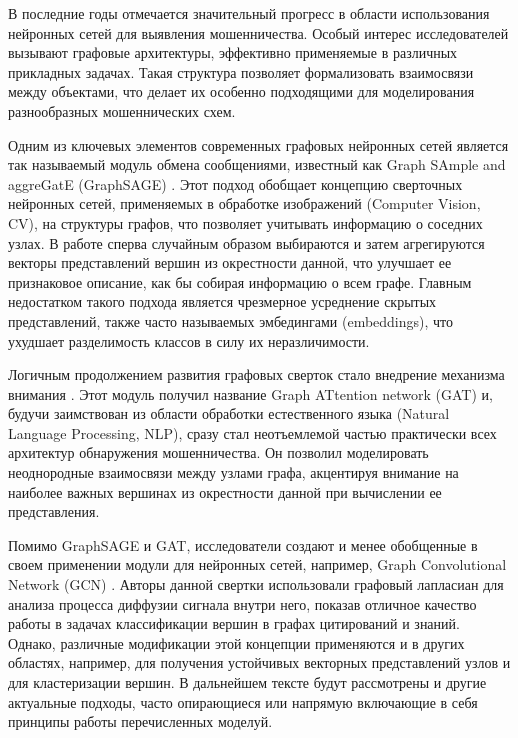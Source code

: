 
В последние годы отмечается значительный прогресс в области использования нейронных сетей для выявления мошенничества. Особый интерес исследователей вызывают графовые архитектуры, эффективно применяемые в различных прикладных задачах. Такая структура позволяет формализовать взаимосвязи между объектами, что делает их особенно подходящими для моделирования разнообразных мошеннических схем.

Одним из ключевых элементов современных графовых нейронных сетей является так называемый модуль обмена сообщениями, известный как Graph SAmple and aggreGatE (GraphSAGE) \cite{hamilton2017}. Этот подход обобщает концепцию сверточных нейронных сетей, применяемых в обработке изображений (Computer Vision, CV), на структуры графов, что позволяет учитывать информацию о соседних узлах. В работе сперва случайным образом выбираются и затем агрегируются векторы представлений вершин из окрестности данной, что улучшает ее признаковое описание, как бы собирая информацию о всем графе. Главным недостатком такого подхода является чрезмерное усреднение скрытых представлений, также часто называемых эмбедингами (embeddings), что ухудшает разделимость классов в силу их неразличимости.

Логичным продолжением развития графовых сверток стало внедрение механизма внимания \cite{vaswani2017}. Этот модуль получил название Graph ATtention network (GAT) \cite{velickovic2017} и, будучи заимствован из области обработки естественного языка (Natural Language Processing, NLP), сразу стал неотъемлемой частью практически всех архитектур обнаружения мошенничества. Он позволил моделировать неоднородные взаимосвязи между узлами графа, акцентируя внимание на наиболее важных вершинах из окрестности данной при вычислении ее представления.

Помимо GraphSAGE и GAT, исследователи создают и менее обобщенные в своем применении модули для нейронных сетей, например, Graph Convolutional Network (GCN) \cite{kipf2017}. Авторы данной свертки использовали графовый лапласиан для анализа процесса диффузии сигнала внутри него, показав отличное качество работы в задачах классификации вершин в графах цитирований и знаний. Однако, различные модификации этой концепции применяются и в других областях, например, для получения устойчивых векторных представлений узлов и для кластеризации вершин. В дальнейшем тексте будут рассмотрены и другие актуальные подходы, часто опирающиеся или напрямую включающие в себя принципы работы перечисленных моделуй.

